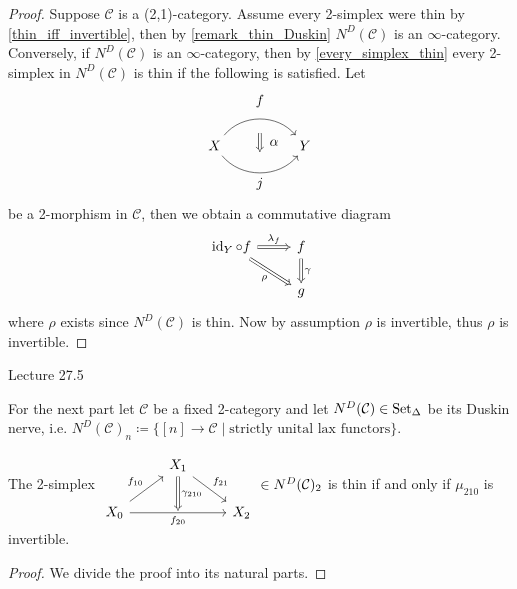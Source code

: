 \begin{proof}
	Suppose $ \mathcal{ C } $ is a  (2,1)-category.
	Assume every 2-simplex were thin by \ref{thin_iff_invertible}, then by \ref{remark_thin_Duskin} $ N^D ( \mathcal{ C } ) $ is an $ \infty $-category.
	Conversely, if $ N^D (\mathcal{ C } ) $ is an $ \infty $-category, then by \ref{every_simplex_thin} every 2-simplex in $ N^D ( \mathcal{ C } ) $ is thin if the following is satisfied.
	Let  
	\[
	\begin{tikzcd}
		X
		\arrow[bend left=50]{rr}[name=U',label=above:$f$]{}
		\arrow[bend right=50]{rr}[name=D',label=below:$j$]{}
		&&
		Y
		\arrow[shorten <=10pt,shorten >=10pt,Rightarrow,to path={(U')-- node[label=right:$ \alpha $] {} (D')}]{} 
	\end{tikzcd}
	\]
	be a 2-morphism in $ \mathcal{ C } $, then we obtain a commutative diagram
	\[
	\begin{tikzcd}	
		\id_Y \circ f 
		\ar[r, Rightarrow, "\lambda_f"]
		\ar[rd, Rightarrow, "\rho"' ]
		&
		f
		\ar[d, Rightarrow, " \gamma "]
		\\
		&
		g
	\end{tikzcd}
	\]
	where $\rho $ exists since $ N^D ( \mathcal{ C } ) $ is thin.
	Now by assumption $ \rho $ is invertible, thus $ \rho $ is invertible.
\end{proof}

Lecture 27.5

For the next part let $ \mathcal{ C } $ be a fixed 2-category and let $ N^D ( \mathcal{ C } ) \in \operatorname{Set}_{\Delta} $ be its Duskin nerve, i.e. $ N^D ( \mathcal{ C } )_n \coloneqq \{ [ n ] \to \mathcal{ C } \mid \text{strictly unital lax functors} \} $.
	
\begin{thm}
\label{thin_iff_invertible}
	The 2-simplex 
	$
	\begin{tikzcd}	
		&
		X_1
		\ar[rd, "f_{21}"]
		\ar[d, Rightarrow, "\gamma_{ 2 1 0 }"] 
		&
		\\
		X_0
		\ar[ru, "f_{10}" ]
		\ar[rr, "f_{20}"' ]
		&
		{}
		&
		X_2
	\end{tikzcd}
	\in
	N^D ( \mathcal{ C } )_2 
	$
	is thin  if and only if $ \mu_{ 2 1 0 } $ is invertible.
\end{thm}

\begin{proof}
	We divide the proof into its natural parts.
\end{proof}
	
